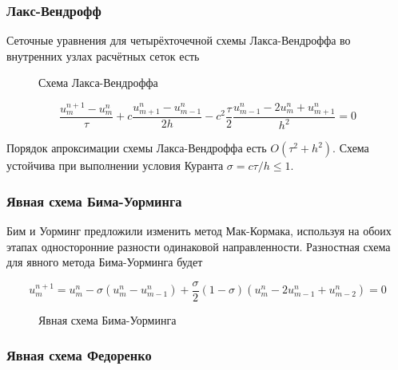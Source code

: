 \documentclass{article}
\begin{document}
\subsubsection{Лакс-Вендрофф}

\indent
Сеточные уравнения для четырёхточечной схемы Лакса-Вендроффа во внутренних узлах расчётных сеток есть

\begin{figure}[h]
\caption{Схема Лакса-Вендроффа}
\label{ris:image}
\end{figure}  

$$\frac{u^{n+1}_m - u^n_m}{\tau} + c\frac{u^n_{m+1} - u^n_{m-1}}{2h} - c^2\frac{\tau}{2}\frac{u^n_{m-1} - 2u^n_m + u^n_{m+1}}{h^2} = 0$$

\indent
Порядок апроксимации схемы Лакса-Вендроффа есть $O(\tau^2 + h^2)$. Схема устойчива при выполнении условия Куранта $\sigma = c\tau/h \leq 1$.

\subsubsection{Явная схема Бима-Уорминга}

\indent
Бим и Уорминг предложили изменить метод Мак-Кормака, используя на обоих этапах односторонние разности одинаковой направленности. Разностная схема для явного метода Бима-Уорминга будет

$$u^{n+1}_m = u^n_m - \sigma(u^n_m - u^n_{m-1}) + \frac{\sigma}{2}(1 - \sigma)(u^n_m -2u^n_{m-1} + u^n_{m-2}) = 0$$

\begin{figure}[h]
\caption{Явная схема Бима-Уорминга}
\label{ris:image}
\end{figure}  

\subsubsection{Явная схема Федоренко}
\end{document}
